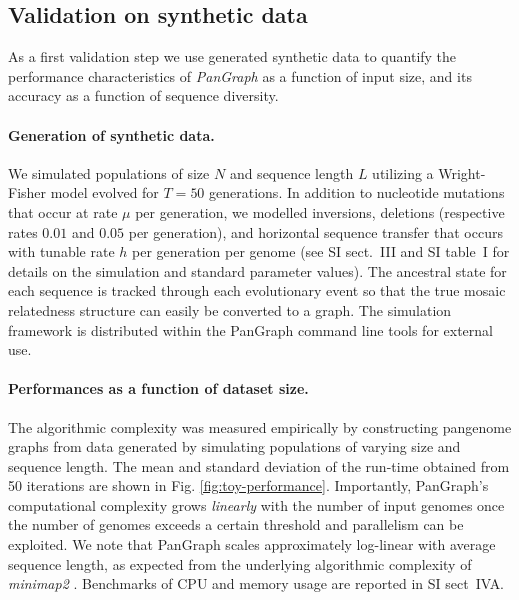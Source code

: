 \documentclass[aps,rmp,preprint,superscriptaddress,10pt,linenumbers]{revtex4-1}
\newcommand{\SIsynthdata}{III}
\newcommand{\SIsimBench}{IV}
\begin{document}
\subsection{Validation on synthetic data}

As a first validation step we use generated synthetic data to quantify the performance characteristics of \textit{PanGraph} as a function of input size, and its accuracy as a function of sequence diversity.

\paragraph*{Generation of synthetic data.}

We simulated populations of size $N$ and sequence length $L$ utilizing a Wright-Fisher model \cite{hudson2002generating} evolved for $T=50$ generations.
In addition to nucleotide mutations that occur at rate $\mu$ per generation, we modelled inversions, deletions (respective rates $0.01$ and $0.05$ per generation), and horizontal sequence transfer that occurs with tunable rate $h$ per generation per genome (see SI sect.~{\SIsynthdata} and SI table~I for details on the simulation and standard parameter values).
The ancestral state for each sequence is tracked through each evolutionary event so that the true mosaic relatedness structure can easily be converted to a graph.
The simulation framework is distributed within the PanGraph command line tools for external use.

\paragraph*{Performances as a function of dataset size.}
The algorithmic complexity was measured empirically by constructing pangenome graphs from data generated by simulating populations of varying size and sequence length.
The mean and standard deviation of the run-time obtained from 50 iterations are shown in Fig. \ref{fig:toy-performance}.
Importantly, PanGraph's computational complexity grows \emph{linearly} with the number of input genomes once the number of genomes exceeds a certain threshold and parallelism can be exploited.
We note that PanGraph scales approximately log-linear with average sequence length, as expected from the underlying algorithmic complexity of \textit{minimap2} \cite{li2018minimap2}.
Benchmarks of CPU and memory usage are reported in SI sect~{\SIsimBench}A.
\end{document}
